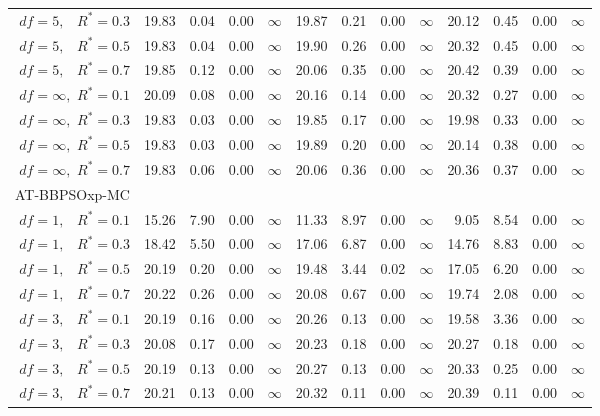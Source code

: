 \documentclass[cmbright]{staauth}
\begin{document}
\begin{table}[ht]
{\begin{tabular}{r|rrrr|rrrr|rrrr}
  $df = 5,\enspace$ $R^* =0.3$ & 19.83 & 0.04 & 0.00 & $\infty$ & 19.87 & 0.21 & 0.00 & $\infty$ & 20.12 & 0.45 & 0.00 & $\infty$ \\
  $df = 5,\enspace$ $R^* =0.5$ & 19.83 & 0.04 & 0.00 & $\infty$ & 19.90 & 0.26 & 0.00 & $\infty$ & 20.32 & 0.45 & 0.00 & $\infty$ \\
  $df = 5,\enspace$ $R^* =0.7$ & 19.85 & 0.12 & 0.00 & $\infty$ & 20.06 & 0.35 & 0.00 & $\infty$ & 20.42 & 0.39 & 0.00 & $\infty$ \\
  $df = \infty,$ $R^* =0.1$ & 20.09 & 0.08 & 0.00 & $\infty$ & 20.16 & 0.14 & 0.00 & $\infty$ & 20.32 & 0.27 & 0.00 & $\infty$ \\
  $df = \infty,$ $R^* =0.3$ & 19.83 & 0.03 & 0.00 & $\infty$ & 19.85 & 0.17 & 0.00 & $\infty$ & 19.98 & 0.33 & 0.00 & $\infty$ \\
  $df = \infty,$ $R^* =0.5$ & 19.83 & 0.03 & 0.00 & $\infty$ & 19.89 & 0.20 & 0.00 & $\infty$ & 20.14 & 0.38 & 0.00 & $\infty$ \\
  $df = \infty,$ $R^* =0.7$ & 19.83 & 0.06 & 0.00 & $\infty$ & 20.06 & 0.36 & 0.00 & $\infty$ & 20.36 & 0.37 & 0.00 & $\infty$ \\
\hline
\multicolumn{1}{l|}{AT-BBPSOxp-MC} &&&&&&&&&&&&\\
  $df = 1,\enspace$ $R^* =0.1$ & 15.26 & 7.90 & 0.00 & $\infty$ & 11.33 & 8.97 & 0.00 & $\infty$ & 9.05 & 8.54 & 0.00 & $\infty$ \\
  $df = 1,\enspace$ $R^* =0.3$ & 18.42 & 5.50 & 0.00 & $\infty$ & 17.06 & 6.87 & 0.00 & $\infty$ & 14.76 & 8.83 & 0.00 & $\infty$ \\
  $df = 1,\enspace$ $R^* =0.5$ & 20.19 & 0.20 & 0.00 & $\infty$ & 19.48 & 3.44 & 0.02 & $\infty$ & 17.05 & 6.20 & 0.00 & $\infty$ \\
  $df = 1,\enspace$ $R^* =0.7$ & 20.22 & 0.26 & 0.00 & $\infty$ & 20.08 & 0.67 & 0.00 & $\infty$ & 19.74 & 2.08 & 0.00 & $\infty$ \\
  $df = 3,\enspace$ $R^* =0.1$ & 20.19 & 0.16 & 0.00 & $\infty$ & 20.26 & 0.13 & 0.00 & $\infty$ & 19.58 & 3.36 & 0.00 & $\infty$ \\
  $df = 3,\enspace$ $R^* =0.3$ & 20.08 & 0.17 & 0.00 & $\infty$ & 20.23 & 0.18 & 0.00 & $\infty$ & 20.27 & 0.18 & 0.00 & $\infty$ \\
  $df = 3,\enspace$ $R^* =0.5$ & 20.19 & 0.13 & 0.00 & $\infty$ & 20.27 & 0.13 & 0.00 & $\infty$ & 20.33 & 0.25 & 0.00 & $\infty$ \\
  $df = 3,\enspace$ $R^* =0.7$ & 20.21 & 0.13 & 0.00 & $\infty$ & 20.32 & 0.11 & 0.00 & $\infty$ & 20.39 & 0.11 & 0.00 & $\infty$ \\

\end{tabular}}
\end{table}
\end{document}
